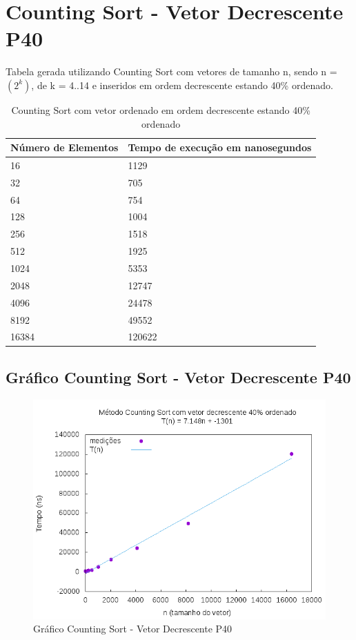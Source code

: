 \documentclass[12pt,a4paper,twoside]{report}
\begin{document}
\section{Counting Sort - Vetor Decrescente P40}
Tabela gerada utilizando Counting Sort com vetores de tamanho n, sendo n = $(2^k)$, de k = 4..14 e inseridos em ordem decrescente estando 40\% ordenado.
\begin{table}[H]
\centering
\caption{Counting Sort com vetor ordenado em ordem decrescente estando 40\% ordenado}
\label{my-label}
\begin{tabular}{|l|l|}
\hline
\multicolumn{1}{|c|}{\textbf{Número de Elementos}} & \multicolumn{1}{c|}{\textbf{Tempo de execução em nanosegundos}} \\ \hline
16 & 1129 \\ \hline
32 & 705 \\ \hline
64 & 754 \\ \hline
128 & 1004 \\ \hline
256 & 1518 \\ \hline
512 & 1925 \\ \hline
1024 & 5353 \\ \hline
2048 & 12747 \\ \hline
4096 & 24478 \\ \hline
8192 & 49552 \\ \hline
16384 & 120622 \\ \hline
\end{tabular}
\end{table}

\subsection{Gráfico Counting Sort - Vetor Decrescente P40}
\begin{figure}[H]
    \centering
    \includegraphics[width=0.7\linewidth]{graficos/CountingSort/vIntDecrescenteP40/vIntDecrescenteP40.png}
  \caption{Gráfico Counting Sort - Vetor Decrescente P40}
\end{figure}
\end{document}
